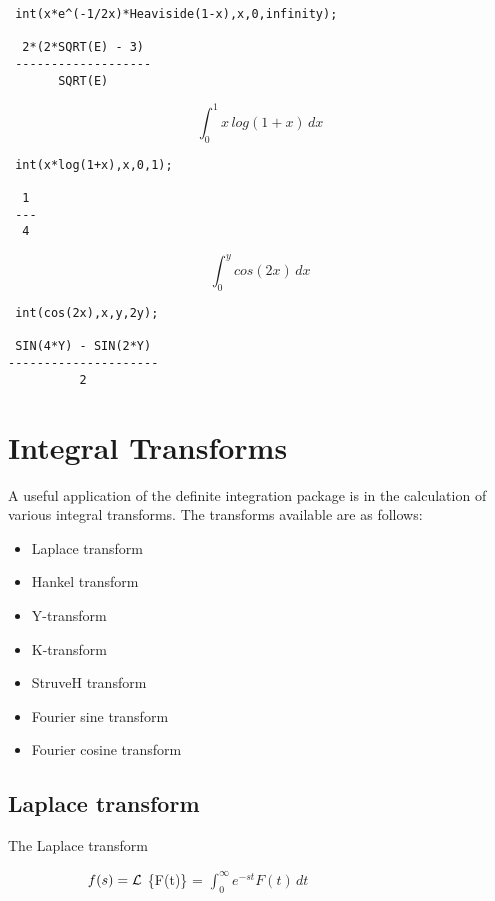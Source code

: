 \begin{verbatim}
 int(x*e^(-1/2x)*Heaviside(1-x),x,0,infinity);

  2*(2*SQRT(E) - 3)
 -------------------
       SQRT(E)
\end{verbatim}

\begin{displaymath}
\int_{0}^{1} x \,log(1+x) \,dx
\end{displaymath}

\begin{verbatim}
 int(x*log(1+x),x,0,1);

  1
 ---
  4
\end{verbatim}

\begin{displaymath}
\int_{0}^{y} cos(2x) \,dx
\end{displaymath}

\begin{verbatim}
 int(cos(2x),x,y,2y);

 SIN(4*Y) - SIN(2*Y)
---------------------
          2
\end{verbatim}


\section{Integral Transforms}

A useful application of the definite integration package is in the
calculation of various integral transforms. The transforms
available are as follows:

\begin{itemize}
\item Laplace transform
\item Hankel transform
\item Y-transform
\item K-transform
\item StruveH transform
\item Fourier sine transform
\item Fourier cosine transform
\end{itemize}

\subsection{Laplace transform}

The Laplace transform

$\hspace{20 mm} f(s) = \cal L$ \{F(t)\} =
$\int_{0}^{\infty} e^{-st}F(t)\,dt$

